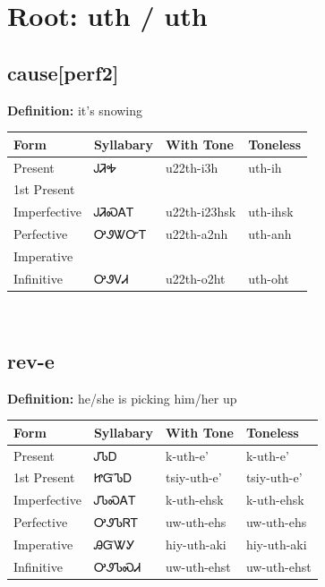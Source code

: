\documentclass{article}%
\begin{document}
%
\normalsize%
\section*{Root: uth / uth}%
\subsection*{cause[perf2]}%
\textbf{Definition: }%
it’s snowing%
\\[0.5em]%
\begin{tabular}{|l|l|l|l|}%
\hline%
\textbf{Form}&\textbf{Syllabary}&\textbf{With Tone}&\textbf{Toneless}\\%
\hline%
Present&ᎫᏘᎭ&u22th{-}i3h&uth{-}ih\\%
1st Present&&&\\%
Imperfective&ᎫᏘᏍᎪᎢ&u22th{-}i23hsk&uth{-}ihsk\\%
Perfective&ᎤᏭᏔᏅᎢ&u22th{-}a2nh&uth{-}anh\\%
Imperative&&&\\%
Infinitive&ᎤᏭᏙᏗ&u22th{-}o2ht&uth{-}oht\\%
\hline%
\end{tabular}%
\\[1em]%
\subsection*{rev-e}%
\textbf{Definition: }%
he/she is picking him/her up%
\\[0.5em]%
\begin{tabular}{|l|l|l|l|}%
\hline%
\textbf{Form}&\textbf{Syllabary}&\textbf{With Tone}&\textbf{Toneless}\\%
\hline%
Present&ᎫᏖᎠ&k{-}uth{-}e'&k{-}uth{-}e'\\%
1st Present&ᏥᏳᏖᎠ&tsiy{-}uth{-}e'&tsiy{-}uth{-}e'\\%
Imperfective&ᎫᏖᏍᎪᎢ&k{-}uth{-}ehsk&k{-}uth{-}ehsk\\%
Perfective&ᎤᏭᏖᏒᎢ&uw{-}uth{-}ehs&uw{-}uth{-}ehs\\%
Imperative&ᎯᏳᏔᎩ&hiy{-}uth{-}aki&hiy{-}uth{-}aki\\%
Infinitive&ᎤᏭᏖᏍᏗ&uw{-}uth{-}ehst&uw{-}uth{-}ehst\\%
\hline%
\end{tabular}%
\\[1em]%
\end{document}
